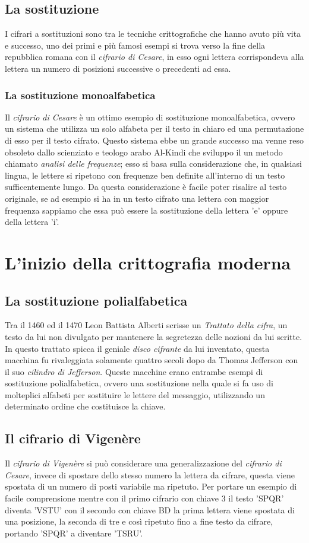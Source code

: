 \documentclass[a4paper, 12pt]{article}
\begin{document}
\subsection{La sostituzione}
I cifrari a sostituzioni sono tra le tecniche crittografiche che hanno avuto più vita e successo, uno dei primi e più famosi esempi si trova verso la fine della repubblica romana con il \textit{cifrario di Cesare}, in esso ogni lettera corrispondeva alla lettera un numero di posizioni successive o precedenti ad essa. 
\subsubsection{La sostituzione monoalfabetica}
Il \textit{cifrario di Cesare} è un ottimo esempio di sostituzione monoalfabetica, ovvero un sistema che utilizza un solo alfabeta per il testo in chiaro ed una permutazione di esso per il testo cifrato.\newline
Questo sistema ebbe un grande successo ma venne reso obsoleto dallo scienziato e teologo arabo Al-Kindi che sviluppo il un metodo chiamato \textit{analisi delle frequenze}; esso si basa sulla considerazione che, in qualsiasi lingua, le lettere si ripetono con frequenze ben definite all'interno di un testo sufficentemente lungo. Da questa considerazione è facile poter risalire al testo originale, se ad esempio si ha in un testo cifrato una lettera con maggior frequenza sappiamo che essa può essere la sostituzione della lettera 'e' oppure della lettera 'i'.
\section{L'inizio della crittografia moderna}
\subsection{La sostituzione polialfabetica}
Tra il 1460 ed il 1470 Leon Battista Alberti scrisse un \textit{Trattato della cifra}, un testo da lui non divulgato per mantenere la segretezza delle nozioni da lui scritte. In questo trattato spicca il geniale \textit{disco cifrante} da lui inventato, questa macchina fu rivaleggiata solamente quattro secoli dopo da Thomas Jefferson con il suo \textit{cilindro di Jefferson}.
Queste macchine erano entrambe esempi di sostituzione polialfabetica, ovvero una sostituzione nella quale si fa uso di molteplici alfabeti per sostituire le lettere del messaggio, utilizzando un determinato ordine che costituisce la chiave.
\subsection{Il cifrario di Vigenère}
Il \textit{cifrario di Vigenère} si può considerare una generalizzazione del \textit{cifrario di Cesare}, invece di spostare dello stesso numero la lettera da cifrare, questa viene spostata di un numero di posti variabile ma ripetuto. Per portare un esempio di facile comprensione mentre con il primo cifrario con chiave 3 il testo 'SPQR' diventa 'VSTU' con il secondo con chiave BD la prima lettera viene spostata di una posizione, la seconda di tre e così ripetuto fino a fine testo da cifrare, portando 'SPQR' a diventare 'TSRU'.
\end{document}

